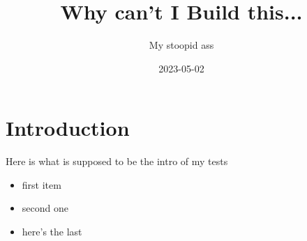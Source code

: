 \documentclass[12pt]{article}
\title{Why can't I Build this...}
\author{My stoopid ass}
\date{2023-05-02}
\begin{document}
\maketitle
\section{Introduction}
    Here is what is supposed to be the intro of my tests
\begin{itemize}
    \item first item
    \item second one 
    \item here's the last
\end{itemize}
\end{document}
